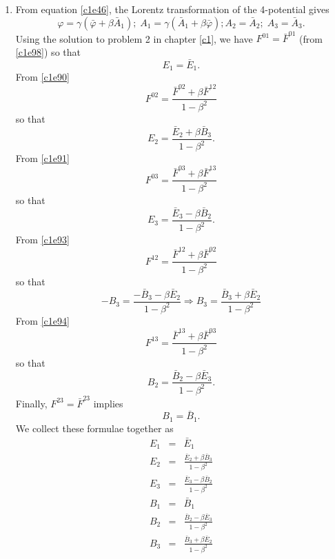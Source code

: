 \begin{enumerate}
\item From equation \eqref{c1e46}, the Lorentz transformation of the 4-potential
gives
\begin{equation}\label{c3e80}
\varphi = \gamma(\bar{\varphi} + \beta\bar{A}_1);
\; A_1 = \gamma(\bar{A}_1 + \beta\bar{\varphi}); A_2 = \bar{A}_2;\; A_3 = \bar{A}_3.
\end{equation}
Using the solution to problem 2 in chapter \ref{c1}, we have $F^{01} = 
\bar{F}^{01}$ (from \eqref{c1e98}) so that 
\begin{equation*}
E_1 = \bar{E}_1.
\end{equation*}
From \eqref{c1e90}
\[
F^{02} = \frac{\bar{F}^{02} + \beta\bar{F}^{12}}{1 - \beta^2}
\]
so that
\begin{equation*}
E_2 = \frac{\bar{E}_2 + \beta\bar{B}_3}{1 - \beta^2}.
\end{equation*}
From \eqref{c1e91}
\[
F^{03} = \frac{\bar{F}^{03} + \beta\bar{F}^{13}}{1 - \beta^2}
\]
so that
\begin{equation*}
E_3 = \frac{\bar{E}_3 - \beta\bar{B}_2}{1 - \beta^2}.
\end{equation*}
From \eqref{c1e93}
\[
F^{12} = \frac{\bar{F}^{12} + \beta\bar{F}^{02}}{1 - \beta^2}
\]
so that
\begin{equation*}
-B_3 = \frac{-\bar{B}_3 - \beta\bar{E}_2}{1 - \beta^2} \Rightarrow 
B_3 = \frac{\bar{B}_3 + \beta\bar{E}_2}{1 - \beta^2}
\end{equation*}
From \eqref{c1e94}
\[
F^{13} = \frac{\bar{F}^{13} + \beta\bar{F}^{03}}{1 - \beta^2}
\]
so that
\begin{equation*}
B_2 = \frac{\bar{B}_2 - \beta\bar{E}_3}{1 - \beta^2}.
\end{equation*}
Finally, $F^{23} = \bar{F}^{23}$ implies
\begin{equation*}
B_1 = \bar{B}_1.
\end{equation*}
We collect these formulae together as
\begin{eqnarray}
E_1 &=& \bar{E}_1 \\ \label{c3e81}
E_2 &=& \frac{\bar{E}_2 + \beta\bar{B}_3}{1 - \beta^2} \\ \label{c3e82}
E_3 &=& \frac{\bar{E}_3 - \beta\bar{B}_2}{1 - \beta^2} \\ \label{c3e83}
B_1 &=& \bar{B}_1 \\ \label{c3e84}
B_2 &=& \frac{\bar{B}_2 - \beta\bar{E}_3}{1 - \beta^2} \\ \label{c3e85}
B_3 &=& \frac{\bar{B}_3 + \beta\bar{E}_2}{1 - \beta^2} \label{c3e86}
\end{eqnarray}


\end{enumerate}
